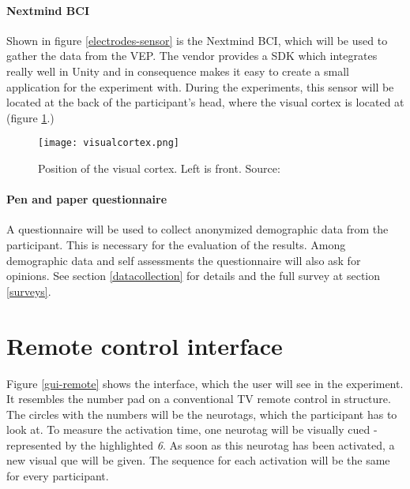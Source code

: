             \paragraph{Nextmind BCI}                

                Shown in figure \ref*{electrodes-sensor} is the Nextmind BCI, which will be used to gather the data from the VEP. The vendor provides a SDK which integrates really well in Unity and in consequence makes it easy to create a small application for the experiment with. During the experiments, this sensor will be located at the back of the participant's head, where the visual cortex is located at (figure \ref*{visual-cortex}.)

                \begin{figure}[h]     %
                    \centering
                    \texttt{[image: visualcortex.png]} 
                    \caption{Position of the visual cortex. Left is front. Source: \cite{Dr.KenBrodaBahm.2013}}\label{visual-cortex}
                \end{figure}

            \paragraph{Pen and paper questionnaire}

                A questionnaire will be used to collect anonymized demographic data from the participant. This is necessary for the evaluation of the results. Among demographic data and self assessments the questionnaire will also ask for opinions. See section \ref*{datacollection} for details and the full survey at section \ref*{surveys}.

        \section{Remote control interface}
        
            Figure \ref*{gui-remote} shows the interface, which the user will see in the experiment. It resembles the number pad on a conventional TV remote control in structure. The circles with the numbers will be the neurotags, which the participant has to look at. To measure the activation time, one neurotag will be visually cued - represented by the highlighted \textit{6}. As soon as this neurotag has been activated, a new visual que will be given. The sequence for each activation will be the same for every participant. 
            
